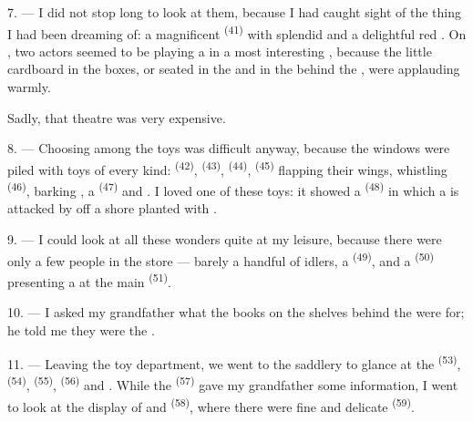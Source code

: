 7. --- I did not stop long to look at them, because I had caught sight of the thing I had been
dreaming of: a magnificent  \textsuperscript{(41)} with splendid
 and a delightful red . On
, two actors seemed to be playing a  in a most
interesting , because the little cardboard  in the boxes, or
seated in the  and in the  behind the
, were applauding warmly.

Sadly, that theatre was very expensive.

8. --- Choosing among the toys was difficult anyway, because the windows were piled with toys
of every kind:  \textsuperscript{(42)},
 \textsuperscript{(43)},  \textsuperscript{(44)}, 
\textsuperscript{(45)} flapping their wings, whistling 
\textsuperscript{(46)}, barking , a  \textsuperscript{(47)}
and
. I loved one of these toys: it showed a
 \textsuperscript{(48)} in which a  is attacked by
 off a shore planted with .


9. --- I could look at all these wonders quite at my leisure, because there were only a few
people in the store --- barely a handful of idlers, a
 \textsuperscript{(49)}, and a  \textsuperscript{(50)} presenting
a  at the main  \textsuperscript{(51)}.

10. --- I asked my grandfather what the books on the shelves behind the
 were for; he told me they were the .

\VUsaut{3.6mm}
\VUsaut{2.8mm}

11. --- Leaving the toy department, we went to the saddlery to glance at the 
\textsuperscript{(53)},  \textsuperscript{(54)},
 \textsuperscript{(55)},  \textsuperscript{(56)} and
. While the  \textsuperscript{(57)} gave
my grandfather some information, I went to look at the display of
 and  \textsuperscript{(58)}, where there were fine
 and delicate  \textsuperscript{(59)}.

